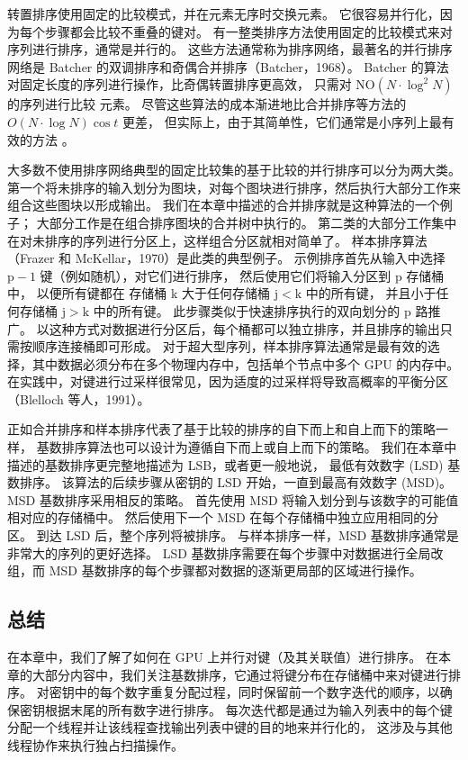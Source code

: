 转置排序使用固定的比较模式，并在元素无序时交换元素。 它很容易并行化，因为每个步骤都会比较不重叠的键对。 
有一整类排序方法使用固定的比较模式来对序列进行排序，通常是并行的。 
这些方法通常称为排序网络，最著名的并行排序网络是 Batcher 的双调排序和奇偶合并排序（Batcher，1968）。 
Batcher 的算法对固定长度的序列进行操作，比奇偶转置排序更高效，
只需对 $\mathrm{N O}\left(N \cdot \log^{2} N\right)$ 的序列进行比较 元素。 
尽管这些算法的成本渐进地比合并排序等方法的 $O(N \cdot \log N) \cos t$ 更差，
但实际上，由于其简单性，它们通常是小序列上最有效的方法 。

大多数不使用排序网络典型的固定比较集的基于比较的并行排序可以分为两大类。 
第一个将未排序的输入划分为图块，对每个图块进行排序，然后执行大部分工作来组合这些图块以形成输出。 
我们在本章中描述的合并排序就是这种算法的一个例子； 大部分工作是在组合排序图块的合并树中执行的。 
第二类的大部分工作集中在对未排序的序列进行分区上，这样组合分区就相对简单了。 
样本排序算法（Frazer 和 McKellar，1970）是此类的典型例子。 
示例排序首先从输入中选择 $\mathrm{p}-1$ 键（例如随机），对它们进行排序，
然后使用它们将输入分区到 $\mathrm{p}$ 存储桶中，
以便所有键都在 存储桶 $\mathrm{k}$ 大于任何存储桶 $\mathrm{j}<\mathrm{k}$ 中的所有键，
并且小于任何存储桶 $\mathrm{j}>\mathrm{k}$ 中的所有键。 此步骤类似于快速排序执行的双向划分的 p 路推广。 
以这种方式对数据进行分区后，每个桶都可以独立排序，并且排序的输出只需按顺序连接桶即可形成。 
对于超大型序列，样本排序算法通常是最有效的选择，其中数据必须分布在多个物理内存中，包括单个节点中多个 GPU 的内存中。 
在实践中，对键进行过采样很常见，因为适度的过采样将导致高概率的平衡分区（Blelloch 等人，1991）。

正如合并排序和样本排序代表了基于比较的排序的自下而上和自上而下的策略一样，
基数排序算法也可以设计为遵循自下而上或自上而下的策略。 我们在本章中描述的基数排序更完整地描述为 LSB，或者更一般地说，
最低有效数字 (LSD) 基数排序。 该算法的后续步骤从密钥的 LSD 开始，一直到最高有效数字 (MSD)。 
MSD 基数排序采用相反的策略。 首先使用 MSD 将输入划分到与该数字的可能值相对应的存储桶中。 
然后使用下一个 MSD 在每个存储桶中独立应用相同的分区。 到达 LSD 后，整个序列将被排序。 
与样本排序一样，MSD 基数排序通常是非常大的序列的更好选择。 
LSD 基数排序需要在每个步骤中对数据进行全局改组，而 MSD 基数排序的每个步骤都对数据的逐渐更局部的区域进行操作。

\subsection{总结}
在本章中，我们了解了如何在 GPU 上并行对键（及其关联值）进行排序。 
在本章的大部分内容中，我们关注基数排序，它通过将键分布在存储桶中来对键进行排序。 
对密钥中的每个数字重复分配过程，同时保留前一个数字迭代的顺序，以确保密钥根据末尾的所有数字进行排序。 
每次迭代都是通过为输入列表中的每个键分配一个线程并让该线程查找输出列表中键的目的地来并行化的，
这涉及与其他线程协作来执行独占扫描操作。


